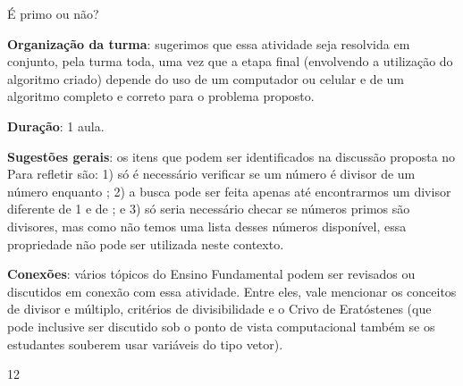 \begin{sugestions}{É primo ou não?}
{
\textbf{Organização da turma}: sugerimos que essa atividade seja resolvida em conjunto, pela turma toda, uma vez que a etapa final (envolvendo a utilização do algoritmo criado) depende do uso de um computador ou celular e de um algoritmo completo e correto para o problema proposto.

\textbf{Duração}: 1 aula.

\textbf{Sugestões gerais}: os itens que podem ser identificados na discussão proposta no Para refletir são: 1) só é necessário verificar se um número  é divisor de um número  enquanto ; 2) a busca pode ser feita apenas até encontrarmos um divisor diferente de 1 e de ; e 3) só seria necessário checar se números primos são divisores, mas como não temos uma lista desses números disponível, essa propriedade não pode ser utilizada neste contexto.

\textbf{Conexões}: vários tópicos do Ensino Fundamental podem ser revisados ou discutidos em conexão com essa atividade. Entre eles, vale mencionar os conceitos de divisor e múltiplo, critérios de divisibilidade e o Crivo de Eratóstenes (que pode inclusive ser discutido sob o ponto de vista computacional também se os estudantes souberem usar variáveis do tipo vetor).
}{1}{2}
\end{sugestions}

